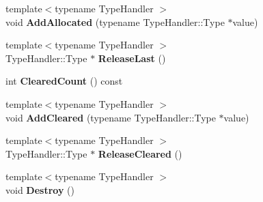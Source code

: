 \begin{DoxyCompactItemize}
\item 
\mbox{\label{classgoogle_1_1protobuf_1_1internal_1_1RepeatedPtrFieldBase_ae68132b4de64eaa301608bd1cad7c0ac}} 
{\footnotesize template$<$typename Type\+Handler $>$ }\\void {\bfseries Add\+Allocated} (typename Type\+Handler\+::\+Type $\ast$value)
\item 
\mbox{\label{classgoogle_1_1protobuf_1_1internal_1_1RepeatedPtrFieldBase_a28f3d4d916923f82c75516f21de50241}} 
{\footnotesize template$<$typename Type\+Handler $>$ }\\Type\+Handler\+::\+Type $\ast$ {\bfseries Release\+Last} ()
\item 
\mbox{\label{classgoogle_1_1protobuf_1_1internal_1_1RepeatedPtrFieldBase_a714b26caffd7f143df046c3ef1f893dd}} 
int {\bfseries Cleared\+Count} () const
\item 
\mbox{\label{classgoogle_1_1protobuf_1_1internal_1_1RepeatedPtrFieldBase_a9a801a51aa2fff180fcbefb0add200a7}} 
{\footnotesize template$<$typename Type\+Handler $>$ }\\void {\bfseries Add\+Cleared} (typename Type\+Handler\+::\+Type $\ast$value)
\item 
\mbox{\label{classgoogle_1_1protobuf_1_1internal_1_1RepeatedPtrFieldBase_aa592c8012cfc0c45641ecea8e36be0c4}} 
{\footnotesize template$<$typename Type\+Handler $>$ }\\Type\+Handler\+::\+Type $\ast$ {\bfseries Release\+Cleared} ()
\item 
\mbox{\label{classgoogle_1_1protobuf_1_1internal_1_1RepeatedPtrFieldBase_a0657788a258fc5ecc59814583f3409cb}} 
{\footnotesize template$<$typename Type\+Handler $>$ }\\void {\bfseries Destroy} ()
\item 
\mbox{\label{classgoogle_1_1protobuf_1_1internal_1_1RepeatedPtrFieldBase_ae9024e422100e8fed315e0414a88d060}} 

\end{DoxyCompactItemize}
